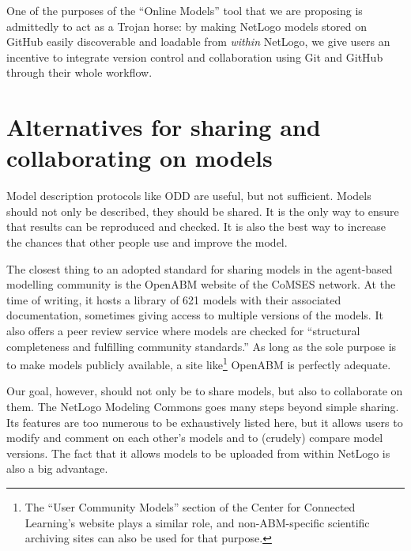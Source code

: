 \documentclass[runningheads]{llncs}
\begin{document}
One of the purposes of the ``Online Models'' tool that we are proposing is admittedly to act as a Trojan horse: by making NetLogo models stored on GitHub easily discoverable and loadable from \emph{within} NetLogo, we give users an incentive to integrate version control and collaboration using Git and GitHub through their whole workflow.

\section{Alternatives for sharing and collaborating on models}

Model description protocols like ODD \cite{grimm_standard_2006,grimm_odd_2010} are useful, but not sufficient. Models should not only be described, they should be shared. It is the only way to ensure that results can be reproduced and checked. It is also the best way to increase the chances that other people use and improve the model.

The closest thing to an adopted standard for sharing models in the agent-based modelling community is the OpenABM website of the CoMSES network\cite{noauthor_comses_nodate}. At the time of writing, it hosts a library of 621 models with their associated documentation, sometimes giving access to multiple versions of the models. It also offers a peer review service where models are checked for ``structural completeness and fulfilling community standards.'' As long as the sole purpose is to make models publicly available, a site like\footnote{The ``User Community Models'' section of the Center for Connected Learning's website\cite{noauthor_netlogo_nodate} plays a similar role, and non-ABM-specific scientific archiving sites\cite{noauthor_dataverse_nodate,noauthor_open_nodate,noauthor_zenodo_nodate} can also be used for that purpose.} OpenABM is perfectly adequate.

Our goal, however, should not only be to share models, but also to collaborate on them. The NetLogo Modeling Commons \cite{lerner_connected_2010,lerner_agent-based_2014} goes many steps beyond simple sharing. Its features are too numerous to be exhaustively listed here, but it allows users to modify and comment on each other's models and to (crudely) compare model versions. The fact that it allows models to be uploaded from within NetLogo is also a big advantage.
\end{document}
